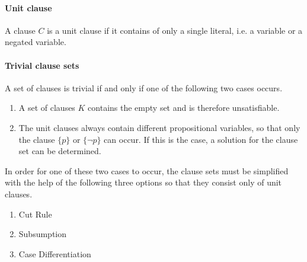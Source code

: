 \paragraph{Unit clause}
A clause $C$ is a unit clause if it contains of only a single literal, i.e. a variable or a negated variable.

\paragraph{Trivial clause sets}
A set of clauses is trivial if and only if one of the following two cases occurs.

\begin{enumerate}
  \item A set of clauses $K$ contains the empty set and is therefore unsatisfiable.
  \item The unit clauses always contain different propositional variables, so that only the clause $\{p\}$ or $\{\neg p\}$ can occur. If this is the case, a solution for the clause set can be determined.
\end{enumerate}

In order for one of these two cases to occur, the clause sets must be simplified with the help of the following three options so that they consist only of unit clauses.

\begin{enumerate}
  \item Cut Rule 
  \item Subsumption
  \item Case Differentiation
\end{enumerate}

